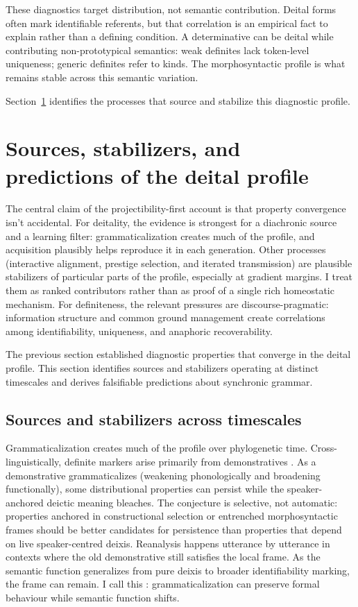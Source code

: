\documentclass[12pt,letterpaper]{article}
\begin{document}
These diagnostics target distribution, not semantic contribution. Deital forms often mark identifiable referents, but that correlation is an empirical fact to explain rather than a defining condition. A determinative can be deital while contributing non-prototypical semantics: weak definites lack token-level uniqueness; generic definites refer to kinds. The morphosyntactic profile is what remains stable across this semantic variation.

Section~\ref{sec:mechanisms} identifies the processes that source and stabilize this diagnostic profile.

\section{Sources, stabilizers, and predictions of the deital profile}\label{sec:mechanisms}

The central claim of the projectibility-first account is that property convergence isn't accidental. For deitality, the evidence is strongest for a diachronic source and a learning filter: grammaticalization creates much of the profile, and acquisition plausibly helps reproduce it in each generation. Other processes (interactive alignment, prestige selection, and iterated transmission) are plausible stabilizers of particular parts of the profile, especially at gradient margins. I treat them as ranked contributors rather than as proof of a single rich homeostatic mechanism. For definiteness, the relevant pressures are discourse-pragmatic: information structure and common ground management create correlations among identifiability, uniqueness, and anaphoric recoverability.

The previous section established diagnostic properties that converge in the deital profile. This section identifies sources and stabilizers operating at distinct timescales and derives falsifiable predictions about synchronic grammar.

\subsection{Sources and stabilizers across timescales}\label{subsec:five-mechanisms}

Grammaticalization creates much of the profile over phylogenetic time. Cross-linguistically, definite markers arise primarily from demonstratives \parencite{greenberg1978,diessel1999}. As a demonstrative grammaticalizes (weakening phonologically and broadening functionally), some distributional properties can persist while the speaker-anchored deictic meaning bleaches. The conjecture is selective, not automatic: properties anchored in constructional selection or entrenched morphosyntactic frames should be better candidates for persistence than properties that depend on live speaker-centred deixis. Reanalysis happens utterance by utterance in contexts where the old demonstrative still satisfies the local frame. As the semantic function generalizes from pure deixis to broader identifiability marking, the frame can remain. I call this : grammaticalization can preserve formal behaviour while semantic function shifts.
\end{document}
